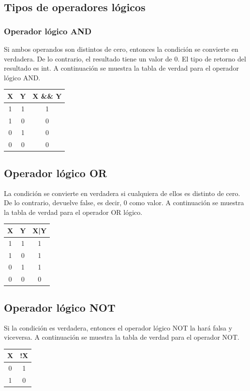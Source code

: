 \documentclass{article}
\begin{document}
\subsection{Tipos de operadores lógicos}
\subsubsection{Operador lógico AND}
Si ambos operandos son distintos de cero, entonces la condición se convierte en verdadera. De lo contrario, el resultado tiene un valor de 0. El tipo de retorno del resultado es int. A continuación se muestra la tabla de verdad para el operador lógico AND.\\

\begin{tabular}{|c|c|c|}
\hline
X & Y & X \&\& Y \\
\hline
1 & 1 & 1 \\
1 & 0 & 0 \\
0 & 1 & 0 \\
0 & 0 & 0 \\
\hline
\end{tabular}

\subsection{Operador lógico OR}
La condición se convierte en verdadera si cualquiera de ellos es distinto de cero. De lo contrario, devuelve false, es decir, 0 como valor. A continuación se muestra la tabla de verdad para el operador OR lógico.\\

\begin{tabular}{|c|c|c|}
\hline
X & Y & X|Y \\
\hline
1 & 1 & 1 \\
1 & 0 & 1 \\
0 & 1 & 1 \\
0 & 0 & 0 \\
\hline
\end{tabular}

\subsection{Operador lógico NOT}
Si la condición es verdadera, entonces el operador lógico NOT la hará falsa y viceversa. A continuación se muestra la tabla de verdad para el operador NOT. \\

\begin{tabular}{|c|c|}
\hline
X & !X \\
\hline
0 & 1 \\
1 & 0 \\
\hline
\end{tabular}
\end{document}
